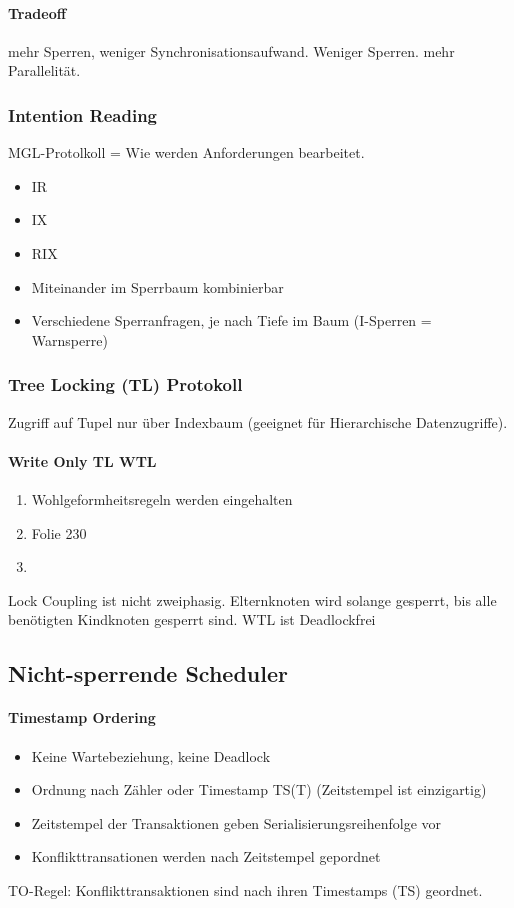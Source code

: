 \documentclass[ngerman]{scrartcl}
\begin{document}
\paragraph{Tradeoff} mehr Sperren, weniger Synchronisationsaufwand. Weniger Sperren. mehr Parallelität.
\subsubsection{Intention Reading}
MGL-Protolkoll = Wie werden Anforderungen bearbeitet.
\begin{itemize}
  \item IR 
  \item IX
  \item RIX
  \item Miteinander im Sperrbaum kombinierbar
  \item Verschiedene Sperranfragen, je nach Tiefe im Baum (I-Sperren = Warnsperre)
\end{itemize}
\subsubsection{Tree Locking (TL) Protokoll}
Zugriff auf Tupel nur über Indexbaum (geeignet für Hierarchische Datenzugriffe). 
\paragraph{Write Only TL WTL}
\begin{enumerate}
  \item Wohlgeformheitsregeln werden eingehalten
  \item Folie 230 
  \item
\end{enumerate}
Lock Coupling ist nicht zweiphasig.  Elternknoten wird solange gesperrt, bis alle benötigten Kindknoten gesperrt sind. WTL ist Deadlockfrei

\subsection{Nicht-sperrende Scheduler}
\paragraph{Timestamp Ordering} 
\begin{itemize}
  \item Keine Wartebeziehung, keine Deadlock
  \item Ordnung nach Zähler oder Timestamp TS(T) (Zeitstempel ist einzigartig)
  \item Zeitstempel der Transaktionen geben Serialisierungsreihenfolge vor
  \item Konflikttransationen werden nach Zeitstempel gepordnet
\end{itemize}
TO-Regel: Konflikttransaktionen sind nach ihren Timestamps (TS) geordnet. 
\end{document}
